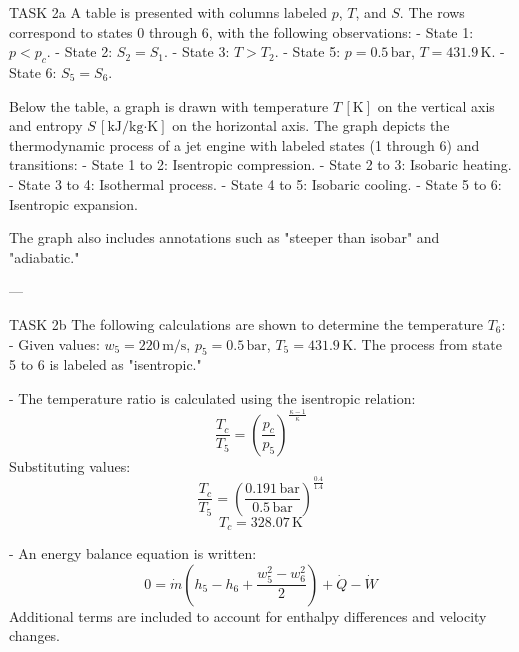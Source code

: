 TASK 2a  
A table is presented with columns labeled \( p \), \( T \), and \( S \). The rows correspond to states 0 through 6, with the following observations:  
- State 1: \( p < p_c \).  
- State 2: \( S_2 = S_1 \).  
- State 3: \( T > T_2 \).  
- State 5: \( p = 0.5 \, \text{bar} \), \( T = 431.9 \, \text{K} \).  
- State 6: \( S_5 = S_6 \).  

Below the table, a graph is drawn with temperature \( T \, [\text{K}] \) on the vertical axis and entropy \( S \, [\text{kJ/kg·K}] \) on the horizontal axis. The graph depicts the thermodynamic process of a jet engine with labeled states (1 through 6) and transitions:  
- State 1 to 2: Isentropic compression.  
- State 2 to 3: Isobaric heating.  
- State 3 to 4: Isothermal process.  
- State 4 to 5: Isobaric cooling.  
- State 5 to 6: Isentropic expansion.  

The graph also includes annotations such as "steeper than isobar" and "adiabatic."  

---

TASK 2b  
The following calculations are shown to determine the temperature \( T_6 \):  
- Given values:  
  \( w_5 = 220 \, \text{m/s} \), \( p_5 = 0.5 \, \text{bar} \), \( T_5 = 431.9 \, \text{K} \).  
  The process from state 5 to 6 is labeled as "isentropic."  

- The temperature ratio is calculated using the isentropic relation:  
  \[
  \frac{T_c}{T_5} = \left( \frac{p_c}{p_5} \right)^{\frac{\kappa - 1}{\kappa}}
  \]  
  Substituting values:  
  \[
  \frac{T_c}{T_5} = \left( \frac{0.191 \, \text{bar}}{0.5 \, \text{bar}} \right)^{\frac{0.4}{1.4}}
  \]  
  \[
  T_c = 328.07 \, \text{K}
  \]  

- An energy balance equation is written:  
  \[
  0 = \dot{m} \left( h_5 - h_6 + \frac{w_5^2 - w_6^2}{2} \right) + \dot{Q} - \dot{W}
  \]  
  Additional terms are included to account for enthalpy differences and velocity changes.  

